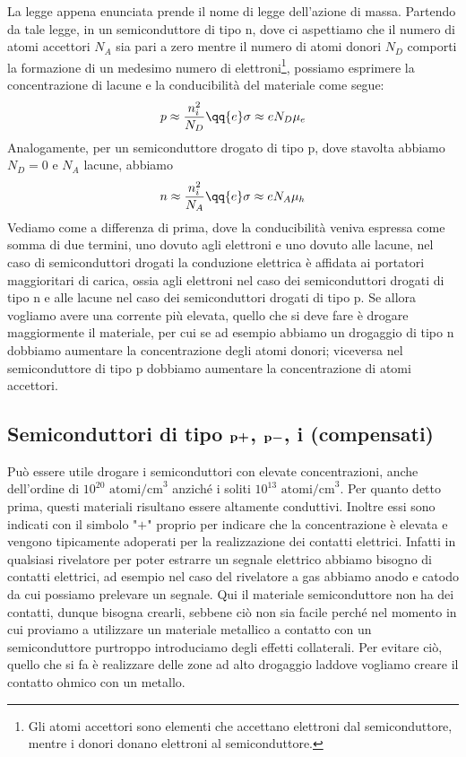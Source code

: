 La legge appena enunciata prende il nome di legge dell'azione di massa. Partendo da tale legge, in un semiconduttore di tipo n, dove ci aspettiamo che il numero di atomi accettori $N_A$ sia pari a zero mentre il numero di atomi donori $N_D$ comporti la formazione di un medesimo numero di elettroni\footnote{Gli atomi accettori sono elementi che accettano elettroni dal semiconduttore, mentre i donori donano elettroni al semiconduttore.}, possiamo esprimere la concentrazione di lacune e la conducibilità del materiale come segue:
\begin{equation*}
   p \approx \frac{n_i^2}{N_D}
   \qq{e}
   \sigma \approx e N_D \mu_e
\end{equation*}
Analogamente, per un semiconduttore drogato di tipo p, dove stavolta abbiamo $N_D=0$ e $N_A$ lacune, abbiamo 
\begin{equation*}
   n \approx \frac{n_i^2}{N_A}
   \qq{e}
   \sigma \approx e N_A \mu_h
\end{equation*}
Vediamo come a differenza di prima, dove la conducibilità veniva espressa come somma di due termini, uno dovuto agli elettroni e uno dovuto alle lacune, nel caso di semiconduttori drogati la conduzione elettrica è affidata ai portatori maggioritari di carica, ossia agli elettroni nel caso dei semiconduttori drogati di tipo n e alle lacune nel caso dei semiconduttori drogati di tipo p. Se allora vogliamo avere una corrente più elevata, quello che si deve fare è drogare maggiormente il materiale, per cui se ad esempio abbiamo un drogaggio di tipo n dobbiamo aumentare la concentrazione degli atomi donori; viceversa nel semiconduttore di tipo p dobbiamo aumentare la concentrazione di atomi accettori.

\subsection[Semiconduttori di tipo \texorpdfstring{$\rm p+$}{p+}, \texorpdfstring{$\rm p-$}{p-}, i (compensati)]
{Semiconduttori di tipo $\boldsymbol{\rm p+}$, $\boldsymbol{\rm p-}$, i (compensati)}
Può essere utile drogare i semiconduttori con elevate concentrazioni, anche dell'ordine di $10^{20}\text{ atomi/cm}^3$ anziché i soliti $10^{13}\text{ atomi/cm}^3$. Per quanto detto prima, questi materiali risultano essere altamente conduttivi. Inoltre essi sono indicati con il simbolo "$+$" proprio per indicare che la concentrazione è elevata e vengono tipicamente adoperati per la realizzazione dei contatti elettrici. Infatti in qualsiasi rivelatore per poter estrarre un segnale elettrico abbiamo bisogno di contatti elettrici, ad esempio nel caso del rivelatore a gas abbiamo anodo e catodo da cui possiamo prelevare un segnale. Qui il materiale semiconduttore non ha dei contatti, dunque bisogna crearli, sebbene ciò non sia facile perché nel momento in cui proviamo a utilizzare un materiale metallico a contatto con un semiconduttore purtroppo introduciamo degli effetti collaterali. Per evitare ciò, quello che si fa è realizzare delle zone ad alto drogaggio laddove vogliamo creare il contatto ohmico con un metallo.

